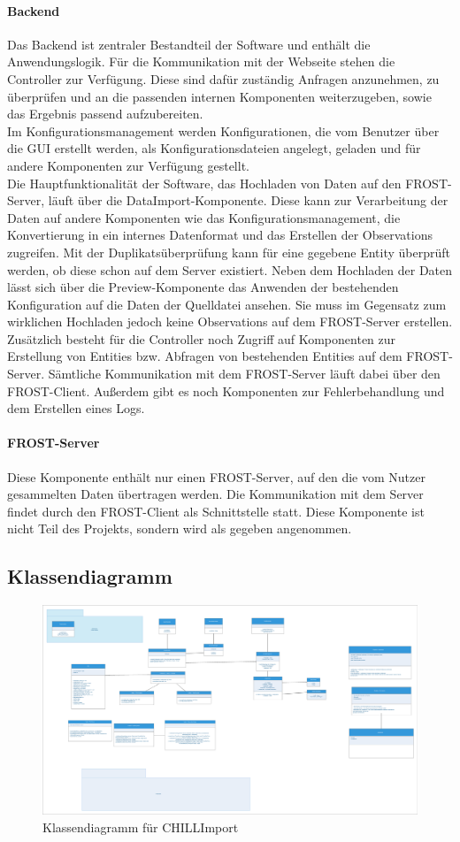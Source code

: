 \paragraph{Backend}
Das Backend ist zentraler Bestandteil der Software und enthält die Anwendungslogik.
Für die Kommunikation mit der Webseite stehen die Controller zur Verfügung.
Diese sind dafür zuständig Anfragen anzunehmen, zu überprüfen und an die passenden internen Komponenten weiterzugeben, sowie das Ergebnis passend aufzubereiten.\\

Im Konfigurationsmanagement werden Konfigurationen, die vom Benutzer über die GUI erstellt werden, als Konfigurationsdateien angelegt, geladen und für andere Komponenten zur Verfügung gestellt.\\

Die Hauptfunktionalität der Software, das Hochladen von Daten auf den FROST-Server, läuft über die DataImport-Komponente.
Diese kann zur Verarbeitung der Daten auf andere Komponenten wie das Konfigurationsmanagement, die Konvertierung in ein internes Datenformat und das Erstellen der Observations zugreifen.
Mit der Duplikatsüberprüfung kann für eine gegebene Entity überprüft werden, ob diese schon auf dem Server existiert.
Neben dem Hochladen der Daten lässt sich über die Preview-Komponente das Anwenden der bestehenden Konfiguration auf die Daten der Quelldatei ansehen.
Sie muss im Gegensatz zum wirklichen Hochladen jedoch keine Observations auf dem FROST-Server erstellen.\\

Zusätzlich besteht für die Controller noch Zugriff auf Komponenten zur Erstellung von Entities bzw. Abfragen von bestehenden Entities auf dem FROST-Server.
Sämtliche Kommunikation mit dem FROST-Server läuft dabei über den FROST-Client.
Außerdem gibt es noch Komponenten zur Fehlerbehandlung und dem Erstellen eines Logs.

\paragraph{FROST-Server}
Diese Komponente enthält nur einen FROST-Server, auf den die vom Nutzer gesammelten Daten übertragen werden.
Die Kommunikation mit dem Server findet durch den FROST-Client als Schnittstelle statt.
Diese Komponente ist nicht Teil des Projekts, sondern wird als gegeben angenommen.

\subsection{Klassendiagramm}

\begin{figure}[htbp]
\centering
\includegraphics[scale=0.15]{Klassendiagramm/klassendiagramm.eps}
\caption{Klassendiagramm für CHILLImport}
\end{figure}